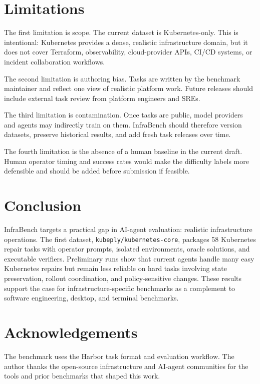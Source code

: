\documentclass[11pt]{article}
\begin{document}
\section{Limitations}

The first limitation is scope. The current dataset is Kubernetes-only. This is
intentional: Kubernetes provides a dense, realistic infrastructure domain, but
it does not cover Terraform, observability, cloud-provider APIs, CI/CD systems,
or incident collaboration workflows.

The second limitation is authoring bias. Tasks are written by the benchmark
maintainer and reflect one view of realistic platform work. Future releases
should include external task review from platform engineers and SREs.

The third limitation is contamination. Once tasks are public, model providers
and agents may indirectly train on them. InfraBench should therefore version
datasets, preserve historical results, and add fresh task releases over time.

The fourth limitation is the absence of a human baseline in the current draft.
Human operator timing and success rates would make the difficulty labels more
defensible and should be added before submission if feasible.

\section{Conclusion}

InfraBench targets a practical gap in AI-agent evaluation: realistic
infrastructure operations. The first dataset,
\texttt{kubeply/kubernetes-core}, packages 58 Kubernetes repair tasks with
operator prompts, isolated environments, oracle solutions, and executable
verifiers. Preliminary runs show that current agents handle many easy
Kubernetes repairs but remain less reliable on hard tasks involving state
preservation, rollout coordination, and policy-sensitive changes. These results
support the case for infrastructure-specific benchmarks as a complement to
software engineering, desktop, and terminal benchmarks.

\section*{Acknowledgements}

The benchmark uses the Harbor task format and evaluation workflow. The author
thanks the open-source infrastructure and AI-agent communities for the tools
and prior benchmarks that shaped this work.



\end{document}
